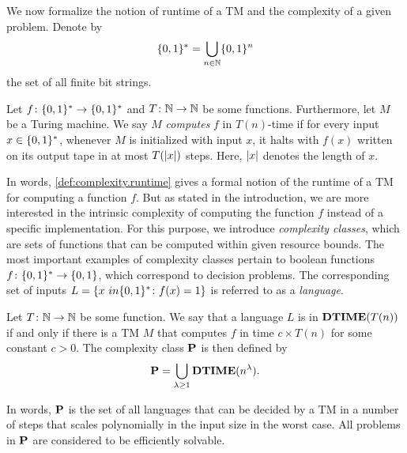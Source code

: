 We now formalize the notion of runtime of a TM and the complexity of a given problem.
Denote by
\[
  \BitStrings = \bigcup_{n \in \Naturals} \{0, 1\}^n
\]
the set of all finite bit strings.

\begin{definition}{\cite[Def.\ 1.3]{Arora_2009_Computational}}
  \label{def:complexity.runtime}
  Let $f\colon \BitStrings \to \BitStrings$ and $T\colon \Naturals \to \Naturals$ be some functions.
  Furthermore, let $M$ be a Turing machine.
  We say $M$ \emph{computes} $f$ in $T(n)$-time if for every input $x \in \BitStrings$, whenever $M$ is initialized with input $x$, it halts with $f(x)$ written on its output tape in at most $T(\abs{x})$ steps.
  Here, $\abs{x}$ denotes the length of $x$.
\end{definition}


In words, \cref{def:complexity.runtime} gives a formal notion of the runtime of a TM for computing a function $f$.
But as stated in the introduction, we are more interested in the intrinsic complexity of computing the function $f$ instead of a specific implementation.
For this purpose, we introduce \emph{complexity classes}, which are sets of functions that can be computed within given resource bounds.
The most important examples of complexity classes pertain to boolean functions $f\colon \BitStrings \to \{0, 1\}$, which correspond to decision problems.
The corresponding set of  inputs $L = \{x \ in \BitStrings\colon f(x) = 1\}$ is referred to as a \emph{language}.
\begin{definition}
  \label{def:complexity.p}
  Let $T\colon \Naturals \to \Naturals$ be some function.
  We say that a language $L$ is in $\DTIME(T(n))$ if and only if there is a TM $M$ that computes $f$ in time $c \times T(n)$ for some constant $c > 0$.
  The complexity class $\P$ is then defined by
  \[
    \P = \bigcup_{\lambda \ge 1} \DTIME(n^\lambda).
  \]
\end{definition}
In words, $\P$ is the set of all languages that can be decided by a TM in a number of steps that scales polynomially in the input size in the worst case.
All problems in $\P$ are considered to be efficiently solvable.

